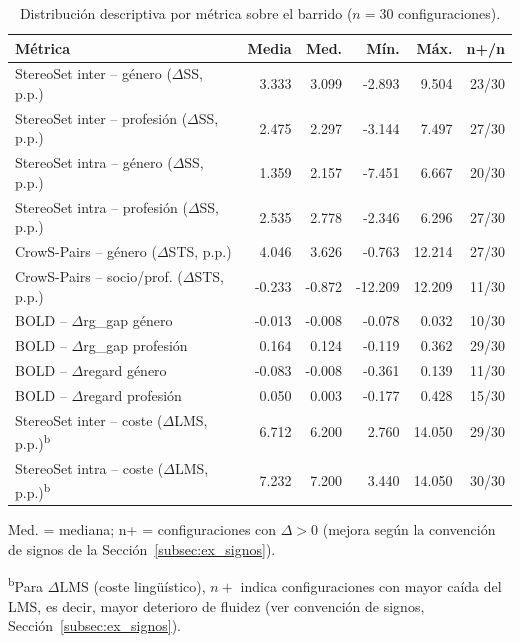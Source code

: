 \documentclass[12pt,a4paper]{report}
\begin{document}
\begin{table}[H]
\centering\footnotesize
\setlength{\tabcolsep}{3pt}
\caption{Distribución descriptiva por métrica sobre el barrido ($n=30$ configuraciones).}
\label{tab:ex_resumen_categoria}
\begin{tabularx}{\linewidth}{@{} Y r r r r r @{}}
\toprule
\textbf{Métrica} & \textbf{Media} & \textbf{Med.} & \textbf{Mín.} & \textbf{Máx.} & \textbf{n+/n} \\
\midrule
StereoSet inter -- género ($\Delta$SS, p.p.) & 3.333 & 3.099 & -2.893 & 9.504 & 23/30 \\
StereoSet inter -- profesión ($\Delta$SS, p.p.) & 2.475 & 2.297 & -3.144 & 7.497 & 27/30 \\
StereoSet intra -- género ($\Delta$SS, p.p.) & 1.359 & 2.157 & -7.451 & 6.667 & 20/30 \\
StereoSet intra -- profesión ($\Delta$SS, p.p.) & 2.535 & 2.778 & -2.346 & 6.296 & 27/30 \\
CrowS-Pairs -- género ($\Delta$STS, p.p.) & 4.046 & 3.626 & -0.763 & 12.214 & 27/30 \\
CrowS-Pairs -- socio/prof. ($\Delta$STS, p.p.) & -0.233 & -0.872 & -12.209 & 12.209 & 11/30 \\
BOLD -- $\Delta$rg\_gap género & -0.013 & -0.008 & -0.078 & 0.032 & 10/30 \\
BOLD -- $\Delta$rg\_gap profesión & 0.164 & 0.124 & -0.119 & 0.362 & 29/30 \\
BOLD -- $\Delta$regard género & -0.083 & -0.008 & -0.361 & 0.139 & 11/30 \\
BOLD -- $\Delta$regard profesión & 0.050 & 0.003 & -0.177 & 0.428 & 15/30 \\
StereoSet inter -- coste ($\Delta$LMS, p.p.)\textsuperscript{b} & 6.712 & 6.200 & 2.760 & 14.050 & 29/30 \\
StereoSet intra -- coste ($\Delta$LMS, p.p.)\textsuperscript{b} & 7.232 & 7.200 & 3.440 & 14.050 & 30/30 \\
\bottomrule
\end{tabularx}
\par\smallskip\footnotesize Med. = mediana; n+ = configuraciones con $\Delta>0$ (mejora según la convención de signos de la Sección~\ref{subsec:ex_signos}).

\textsuperscript{b}Para $\Delta\mathrm{LMS}$ (coste lingüístico), $n+$ indica configuraciones con mayor caída del LMS, es decir, mayor deterioro de fluidez (ver convención de signos, Sección~\ref{subsec:ex_signos}).
\end{table}
\end{document}
